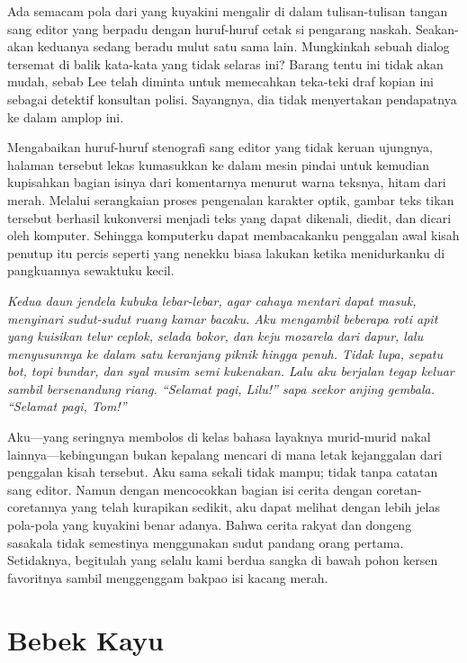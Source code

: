 \documentclass[smalldemyvopaper,11pt,twoside,onecolumn,openright,extrafontsizes]{memoir}
\begin{document}

Ada semacam pola dari yang kuyakini mengalir di dalam tulisan-tulisan tangan sang editor yang berpadu dengan huruf-huruf cetak si pengarang naskah. Seakan-akan keduanya sedang beradu mulut satu sama lain. Mungkinkah sebuah dialog tersemat di balik kata-kata yang tidak selaras ini? Barang tentu ini tidak akan mudah, sebab Lee telah diminta untuk memecahkan teka-teki draf kopian ini sebagai detektif konsultan polisi. Sayangnya, dia tidak menyertakan pendapatnya ke dalam amplop ini.


Mengabaikan huruf-huruf stenografi sang editor yang tidak keruan ujungnya, halaman tersebut lekas kumasukkan ke dalam mesin pindai untuk kemudian kupisahkan bagian isinya dari komentarnya menurut warna teksnya, hitam dari merah. Melalui serangkaian proses pengenalan karakter optik, gambar teks tikan tersebut berhasil kukonversi menjadi teks yang dapat dikenali, diedit, dan dicari oleh komputer. Sehingga komputerku dapat membacakanku penggalan awal kisah penutup itu percis seperti yang nenekku biasa lakukan ketika menidurkanku di pangkuannya sewaktuku kecil.

\textit{Kedua daun jendela kubuka lebar-lebar, agar cahaya mentari dapat masuk, menyinari sudut-sudut ruang kamar bacaku. Aku mengambil beberapa roti apit yang kuisikan telur ceplok, selada bokor, dan keju mozarela dari dapur, lalu menyusunnya ke dalam satu keranjang piknik hingga penuh. Tidak lupa, sepatu bot, topi bundar, dan syal musim semi kukenakan. Lalu aku berjalan tegap keluar sambil bersenandung riang. ``Selamat pagi, Lilu!'' sapa seekor anjing gembala. ``Selamat pagi, Tom!''}


Aku---yang seringnya membolos di kelas bahasa layaknya murid-murid nakal lainnya---kebingungan bukan kepalang mencari di mana letak kejanggalan dari penggalan kisah tersebut. Aku sama sekali tidak mampu; tidak tanpa catatan sang editor. Namun dengan mencocokkan bagian isi cerita dengan coretan-coretannya yang telah kurapikan sedikit, aku dapat melihat dengan lebih jelas pola-pola yang kuyakini benar adanya. Bahwa cerita rakyat dan dongeng sasakala tidak semestinya menggunakan sudut pandang orang pertama. Setidaknya, begitulah yang selalu kami berdua sangka di bawah pohon kersen favoritnya sambil menggenggam bakpao isi kacang merah.

\chapter{Bebek Kayu}
\end{document}

